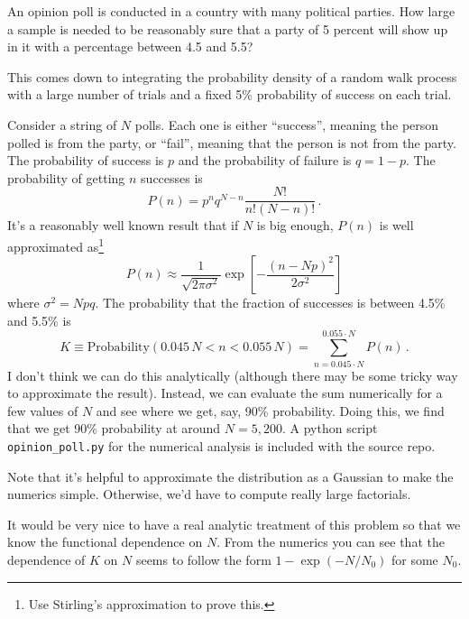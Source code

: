 

An opinion poll is conducted in a country with many political parties.
How large a sample is needed to be reasonably sure that a party of 5 percent will show up in it with a percentage between 4.5 and 5.5?


This comes down to integrating the probability density of a random walk process with a large number of trials and a fixed 5\% probability of success on each trial.

Consider a string of $N$ polls.
Each one is either ``success'', meaning the person polled is from the party, or ``fail'', meaning that the person is not from the party.
The probability of success is $p$ and the probability of failure is $q = 1 - p$.
The probability of getting $n$ successes is
\begin{equation*}
P(n) = p^n q^{N-n} \frac{N!}{n! (N-n)!} \, .
\end{equation*}
It's a reasonably well known result that if $N$ is big enough, $P(n)$ is well approximated as\footnote{Use Stirling's approximation to prove this.}
\begin{equation*}
P(n) \approx \frac{1}{\sqrt{2\pi \sigma^2}} \exp \left[ - \frac{(n - Np)^2}{2 \sigma^2}\right]
\end{equation*}
where $\sigma^2 = Npq$.
The probability that the fraction of successes is between 4.5\% and 5.5\% is
\begin{equation*}
K \equiv \text{Probability}(0.045\,N < n < 0.055\,N) = \sum_{n=0.045 \cdot N}^{0.055 \cdot N} P(n) \, .
\end{equation*}
I don't think we can do this analytically (although there may be some tricky way to approximate the result).
Instead, we can evaluate the sum numerically for a few values of $N$ and see where we get, say, 90\% probability.
Doing this, we find that we get 90\% probability at around $N=5,200$.
A python script \texttt{opinion\_poll.py} for the numerical analysis is included with the source repo.

Note that it's helpful to approximate the distribution as a Gaussian to make the numerics simple.
Otherwise, we'd have to compute really large factorials.

It would be very nice to have a real analytic treatment of this problem so that we know the functional dependence on $N$.
From the numerics you can see that the dependence of $K$ on $N$ seems to follow the form $1 - \exp(-N/N_0)$ for some $N_0$.
